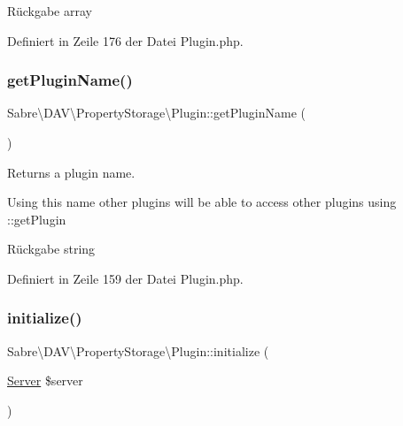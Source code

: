 \begin{DoxyReturn}{Rückgabe}
array 
\end{DoxyReturn}


Definiert in Zeile 176 der Datei Plugin.\+php.

\mbox{\label{class_sabre_1_1_d_a_v_1_1_property_storage_1_1_plugin_a722c15e74fa0ae4df44b52bc6ca74cf0}} 
\subsubsection{\texorpdfstring{get\+Plugin\+Name()}{getPluginName()}}
{\footnotesize\ttfamily Sabre\textbackslash{}\+D\+A\+V\textbackslash{}\+Property\+Storage\textbackslash{}\+Plugin\+::get\+Plugin\+Name (\begin{DoxyParamCaption}{ }\end{DoxyParamCaption})}

Returns a plugin name.

Using this name other plugins will be able to access other plugins using \+::get\+Plugin

\begin{DoxyReturn}{Rückgabe}
string 
\end{DoxyReturn}


Definiert in Zeile 159 der Datei Plugin.\+php.

\mbox{\label{class_sabre_1_1_d_a_v_1_1_property_storage_1_1_plugin_a303796e166e3f2b4d9ef31b14a3c5f6c}} 
\subsubsection{\texorpdfstring{initialize()}{initialize()}}
{\footnotesize\ttfamily Sabre\textbackslash{}\+D\+A\+V\textbackslash{}\+Property\+Storage\textbackslash{}\+Plugin\+::initialize (\begin{DoxyParamCaption}\item[{\mbox{\hyperlink{class_sabre_1_1_d_a_v_1_1_server}{Server}}}]{\$server }\end{DoxyParamCaption})}

